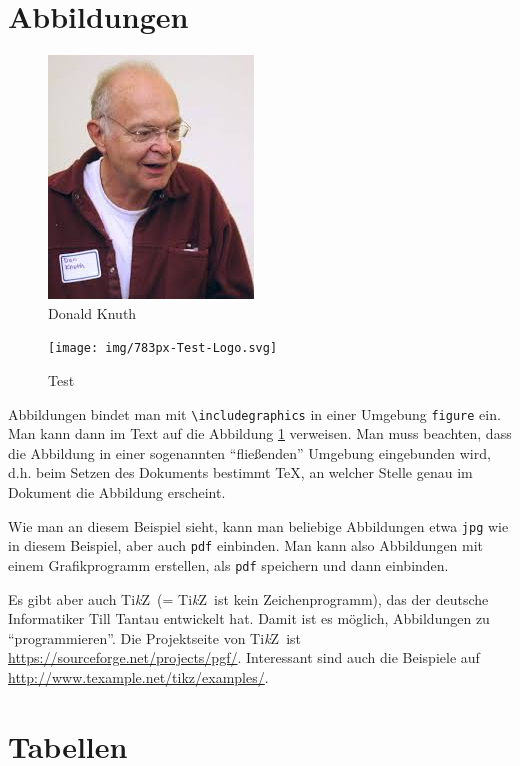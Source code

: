 \section{Abbildungen}

\begin{figure}[!htb]
	\centering
	\includegraphics[width=.4\textwidth]{img/knuth.jpg}
	\caption{Donald Knuth}
\label{fig:knuth}
\end{figure}


\begin{figure}[!htb]
	\centering
	\texttt{[image: img/783px-Test-Logo.svg]}
	\caption{Test}
	\label{fig:test}
\end{figure}

Abbildungen bindet man mit \verb=\includegraphics= in einer Umgebung
\verb=figure= ein.
Man kann dann im Text auf die Abbildung \ref{fig:knuth} verweisen.
Man muss beachten, dass die Abbildung in einer sogenannten
\enquote{fließenden} Umgebung eingebunden wird, d.h. beim Setzen des
Dokuments bestimmt \TeX, an welcher Stelle genau im Dokument die
Abbildung erscheint.

Wie man an diesem Beispiel sieht, kann man beliebige Abbildungen etwa
\verb=jpg= wie in diesem Beispiel, aber auch \verb=pdf= einbinden. Man
kann also Abbildungen mit einem Grafikprogramm erstellen, als
\verb=pdf= speichern und dann einbinden.

\newcommand{\tikz}{Ti\emph{k}Z}

Es gibt aber auch \tikz\ (= \tikz\ ist kein Zeichenprogramm), das der
deutsche Informatiker Till Tantau entwickelt hat. Damit ist es möglich,
Abbildungen zu \enquote{programmieren}. Die Projektseite von \tikz\ ist
\url{https://sourceforge.net/projects/pgf/}. Interessant sind auch
die Beispiele auf \url{http://www.texample.net/tikz/examples/}.

\section{Tabellen}

